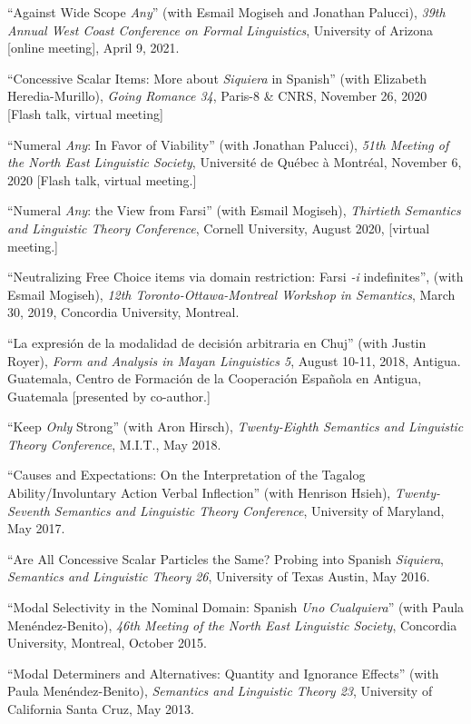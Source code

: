 \documentclass[11pt]{article}
\begin{document}
``Against Wide Scope \textit{Any}'' (with Esmail Mogiseh and Jonathan Palucci), \textit{39th Annual West Coast Conference on Formal Linguistics}, University of Arizona [online meeting], April 9, 2021.

``Concessive Scalar Items: More about \textit{Siquiera} in Spanish'' (with Elizabeth Heredia-Murillo),
\textit{Going Romance 34}, Paris-8 \& CNRS, November 26, 2020 [Flash talk, virtual meeting]

``Numeral
\textit{Any}: In Favor of Viability'' (with Jonathan Palucci),  \textit{51th Meeting of the
  North East Linguistic Society}, Universit\'e de Qu\'ebec \`a
Montr\'eal, November 6, 2020 [Flash talk, virtual meeting.]

``Numeral \textit{Any}: the View from Farsi'' (with Esmail Mogiseh), \textit{Thirtieth Semantics and Linguistic Theory Conference}, Cornell University, August 2020, [virtual meeting.]

``Neutralizing Free Choice items via domain restriction: Farsi \textit{-i} indefinites'', (with Esmail Mogiseh), \textit{12th Toronto-Ottawa-Montreal Workshop in Semantics}, March 30, 2019, Concordia University, Montreal.

``La expresi\'on de la modalidad de decisi\'on arbitraria en Chuj'' (with Justin Royer), \textit{Form and Analysis in Mayan Linguistics 5}, August 10-11, 2018, Antigua. Guatemala, Centro de Formaci\'on de la Cooperaci\'on Espa\~nola en Antigua, Guatemala [presented by co-author.]

``Keep \textit{Only} Strong'' (with Aron Hirsch), \textit{Twenty-Eighth Semantics and Linguistic Theory Conference}, M.I.T., May 2018. 

``Causes and Expectations: On the Interpretation of the Tagalog Ability/Involuntary Action Verbal Inflection'' (with Henrison Hsieh), \textit{Twenty-Seventh Semantics and Linguistic Theory Conference}, University of Maryland, May 2017. 


``Are All Concessive Scalar Particles the Same? Probing into Spanish \textit{Siquiera}, \textit{Semantics and Linguistic Theory 26}, University of Texas Austin, May 2016. 

``Modal Selectivity in the Nominal Domain: Spanish \textit{Uno Cualquiera}'' (with Paula Men\'endez-Benito), \textit{46th Meeting of the North East Linguistic Society}, Concordia University, Montreal, October 2015. 

``Modal Determiners and Alternatives: Quantity and Ignorance
Effects'' (with Paula Men\'endez-Benito), \textit{Semantics and
  Linguistic Theory 23}, University of California Santa Cruz, May 2013. 
\end{document}
